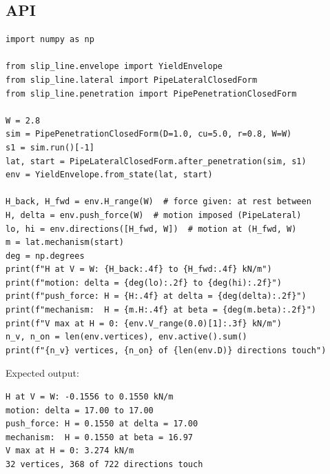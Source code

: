\documentclass[11pt,a4paper]{article}
\begin{document}
\subsection{API}

\begin{lstlisting}
import numpy as np

from slip_line.envelope import YieldEnvelope
from slip_line.lateral import PipeLateralClosedForm
from slip_line.penetration import PipePenetrationClosedForm

W = 2.8
sim = PipePenetrationClosedForm(D=1.0, cu=5.0, r=0.8, W=W)
s1 = sim.run()[-1]
lat, start = PipeLateralClosedForm.after_penetration(sim, s1)
env = YieldEnvelope.from_state(lat, start)

H_back, H_fwd = env.H_range(W)  # force given: at rest between
H, delta = env.push_force(W)  # motion imposed (PipeLateral)
lo, hi = env.directions([H_fwd, W])  # motion at (H_fwd, W)
m = lat.mechanism(start)
deg = np.degrees
print(f"H at V = W: {H_back:.4f} to {H_fwd:.4f} kN/m")
print(f"motion: delta = {deg(lo):.2f} to {deg(hi):.2f}")
print(f"push_force: H = {H:.4f} at delta = {deg(delta):.2f}")
print(f"mechanism:  H = {m.H:.4f} at beta = {deg(m.beta):.2f}")
print(f"V max at H = 0: {env.V_range(0.0)[1]:.3f} kN/m")
n_v, n_on = len(env.vertices), env.active().sum()
print(f"{n_v} vertices, {n_on} of {len(env.D)} directions touch")
\end{lstlisting}

Expected output:
\begin{lstlisting}[numbers=none]
H at V = W: -0.1556 to 0.1550 kN/m
motion: delta = 17.00 to 17.00
push_force: H = 0.1550 at delta = 17.00
mechanism:  H = 0.1550 at beta = 16.97
V max at H = 0: 3.274 kN/m
32 vertices, 368 of 722 directions touch
\end{lstlisting}
\end{document}
